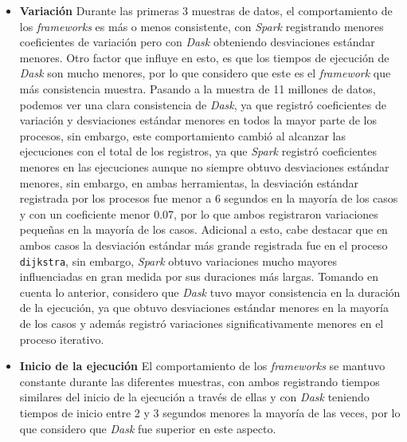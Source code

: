 \begin{itemize}
	\item \textbf{Variación} Durante las primeras 3 muestras de datos, el comportamiento de los \textit{frameworks} es más o menos consistente, con \textit{Spark} registrando menores coeficientes de variación pero con \textit{Dask} obteniendo desviaciones estándar menores. Otro factor que influye en esto, es que los tiempos de ejecución de \textit{Dask} son mucho menores, por lo que considero que este es el \textit{framework} que más consistencia muestra. Pasando a la muestra de 11 millones de datos, podemos ver una clara consistencia de \textit{Dask}, ya que registró coeficientes de variación y desviaciones estándar menores en todos la mayor parte de los procesos, sin embargo, este comportamiento cambió al alcanzar las ejecuciones con el total de los registros, ya que \textit{Spark} registró coeficientes menores en las ejecuciones aunque no siempre obtuvo desviaciones estándar menores, sin embargo, en ambas herramientas, la desviación estándar registrada por los procesos fue menor a 6 segundos en la mayoría de los casos y con un coeficiente menor 0.07, por lo que ambos registraron variaciones pequeñas en la mayoría de los casos. Adicional a esto, cabe destacar que en ambos casos la desviación estándar más grande registrada fue en el proceso \texttt{dijkstra}, sin embargo, \textit{Spark} obtuvo variaciones mucho mayores influenciadas en gran medida por sus duraciones más largas. Tomando en cuenta lo anterior, considero que \textit{Dask} tuvo mayor consistencia en la duración de la ejecución, ya que obtuvo desviaciones estándar menores en la mayoría de los casos y además registró variaciones significativamente menores en el proceso iterativo.
	
	\item \textbf{Inicio de la ejecución} El comportamiento de los \textit{frameworks} se mantuvo constante durante las diferentes muestras, con ambos registrando tiempos similares del inicio de la ejecución a través de ellas y con \textit{Dask} teniendo tiempos de inicio entre 2 y 3 segundos menores la mayoría de las veces, por lo que considero que \textit{Dask} fue superior en este aspecto.
	

\end{itemize}

